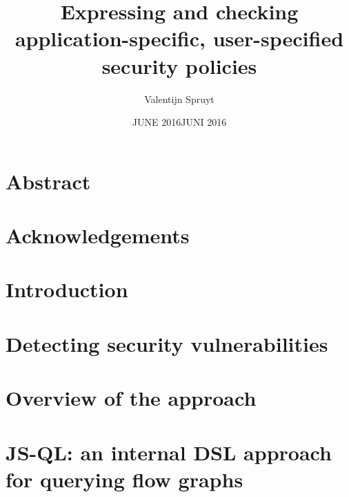 \documentclass[a4paper, 12pt]{report}
\author{Valentijn Spruyt}
\title{Expressing and checking application-specific, user-specified security policies}
\date{JUNE 2016}
\begin{document}
\maketitlepage
 
 
\date{JUNI 2016}
 
\maketitlepage


\chapter*{Abstract}
 
 
 
\chapter*{Acknowledgements}
 
\tableofcontents



\chapter{Introduction}


\chapter{Detecting security vulnerabilities}

 
\chapter{Overview of the approach}


\chapter{JS-QL: an internal DSL approach for querying flow graphs}
\label{ch:JSQL}

 
\end{document}

